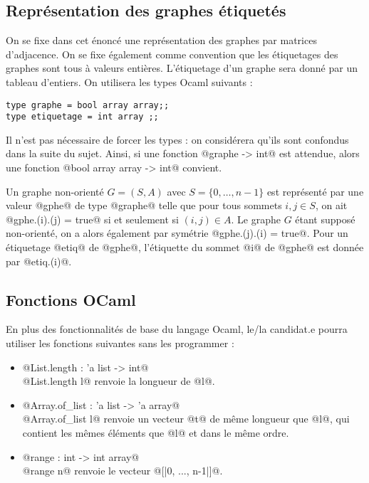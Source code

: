 \subsection*{Représentation des graphes étiquetés}
On se fixe dans cet énoncé une représentation des graphes par matrices d'adjacence. On se fixe également comme convention que les étiquetages des graphes sont tous à valeurs entières. L'étiquetage d'un graphe sera donné par un tableau d'entiers. On utilisera les types Ocaml suivants : 
\begin{lstlisting} 
type graphe = bool array array;;
type etiquetage = int array ;; 
\end{lstlisting}
Il n'est pas nécessaire de forcer les types : on considérera qu'ils sont confondus dans la suite du sujet. Ainsi, si une fonction @graphe -> int@ est attendue, alors une fonction @bool array array -> int@ convient. 

Un graphe non-orienté $G = (S,A)$ avec $S= \{ 0, \dots, n-1\}$ est représenté par une valeur @gphe@ de type @graphe@ telle que pour tous sommets $i,j \in S$, on ait @gphe.(i).(j) = true@ si et seulement si $(i,j) \in A$. Le graphe $G$ étant supposé non-orienté, on a alors également par symétrie @gphe.(j).(i) = true@. Pour un étiquetage @etiq@ de @gphe@, l'étiquette du sommet @i@ de @gphe@ est donnée par @etiq.(i)@. 

\newpage
\subsection*{Fonctions OCaml}
En plus des fonctionnalités de base du langage Ocaml, le/la candidat.e pourra utiliser les fonctions suivantes sans les programmer : 
\begin{itemize} 
    \item @List.length : 'a list -> int@ \\
    @List.length l@ renvoie la longueur de @l@.
    \item @Array.of_list : 'a list -> 'a array@ \\
    @Array.of_list l@ renvoie un vecteur @t@ de même longueur que @l@, qui contient les mêmes éléments que @l@ et dans le même ordre.
    \item @range : int -> int array@\\ 
    @range n@ renvoie le vecteur @[|0, ..., n-1|]@.
\end{itemize}
